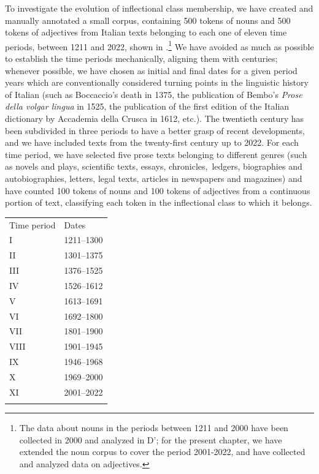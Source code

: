 \documentclass[output=paper]{langscibook}
\begin{document}
To investigate the evolution of inflectional class membership, we have created and manually annotated a small corpus, containing 500 tokens of nouns and 500 tokens of adjectives from Italian texts belonging to each one of eleven time periods, between 1211 and 2022, shown in .\footnote{The data about nouns in the periods between 1211 and 2000 have been collected in 2000 and analyzed in D’\citet{AchilleThornton2003}; for the present chapter, we have extended the noun corpus to cover the period 2001-2022, and have collected and analyzed data on adjectives.} We have avoided as much as possible to establish the time periods mechanically, aligning them with centuries; whenever possible, we have chosen as initial and final dates for a given period years which are conventionally considered turning points in the linguistic history of Italian (such as Boccaccio’s death in 1375, the publication of Bembo’s \textit{Prose della volgar lingua} in 1525, the publication of the first edition of the Italian dictionary by Accademia della Crusca in 1612, etc.). The twentieth century has been subdivided in three periods to have a better grasp of recent developments, and we have included texts from the twenty-first century up to 2022. For each time period, we have selected five prose texts belonging to different genres (such as novels and plays, scientific texts, essays, chronicles,~ledgers, biographies and autobiographies, letters, legal texts, articles in newspapers and magazines) and have counted 100 tokens of nouns and 100 tokens of adjectives from a continuous portion of text, classifying each token in the inflectional class to which it belongs.

\begin{table}
\caption{Time periods used to partition the corpus analyzed}
\label{tab:key:7}
\end{table}


\begin{tabularx}{\textwidth}{XX}

\lsptoprule

Time period & Dates\\
I & 1211–1300\\
II & 1301–1375 \\
III & 1376–1525 \\
IV & 1526–1612 \\
V & 1613–1691\\
VI & 1692–1800\\
VII & 1801–1900\\
VIII & 1901–1945 \\
IX & 1946–1968\\
X & 1969–2000\\
XI & 2001–2022\\
\lspbottomrule
\end{tabularx}
\end{document}
